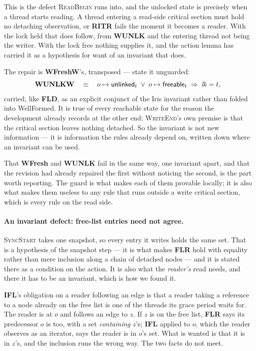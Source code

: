 This is the defect \textsc{ReadBegin} runs into, and the unlocked state is
precisely when a thread starts reading.  A thread entering a read-side critical
section must hold no detaching observation, or \textbf{RITR} fails the moment it
becomes a reader.  With the lock held that does follow, from \textbf{WUNLK} and
the entering thread not being the writer.  With the lock free nothing supplies
it, and the action lemma has carried it as a hypothesis for want of an invariant
that does.

The repair is \textbf{WFreshW}'s, transposed --- state it unguarded:
\[
  \textbf{WUNLKW} \quad\equiv\quad
  o \mapsto \textsf{unlinked}{}_t \;\vee\; o \mapsto \textsf{freeable}{}_t
  \;\Rightarrow\; \mathit{lk} = t ,
\]
carried, like \textbf{FLD}, as an explicit conjunct of the Iris invariant rather
than folded into \textsf{WellFormed}.  It is true of every reachable state for the reason the development already
records at the other end: \textsc{WriteEnd}'s own premise is that the critical
section leaves nothing detached.  So the invariant is not new information ---
it is information the rules already depend on, written down where an invariant
can be used.

That \textbf{WFresh} and \textbf{WUNLK} fail in the same way, one invariant
apart, and that the revision had already repaired the first without noticing the
second, is the part worth reporting.  The guard is what makes each of them
provable locally; it is also what makes them useless to any rule that runs
outside a write critical section, which is every rule on the read side.

\paragraph{An invariant defect: free-list entries need not agree.}
\label{sec:defect-samesnap}
\textsc{SyncStart} takes one snapshot, so every entry it writes holds the same
set.  That is a hypothesis of the snapshot step --- it is what makes \textbf{FLR}
hold with equality rather than mere inclusion along a chain of detached nodes
--- and it is stated there as a condition on the action.  It is also what the
\emph{reader's} read needs, and there it has to be an invariant, which is how we
found it.

\textbf{IFL}'s obligation on a reader following an edge is that a reader taking
a reference to a node already on the free list is one of the threads its grace
period waits for.  The reader is at $o$ and follows an edge to $z$.  If $z$ is
on the free list, \textbf{FLR} says its predecessor $o$ is too, with a set
\emph{containing} $z$'s; \textbf{IFL} applied to $o$, which the reader observes
as an iterator, says the reader is in $o$'s set.  What is wanted is that it is in
$z$'s, and the inclusion runs the wrong way.  The two facts do not meet.


